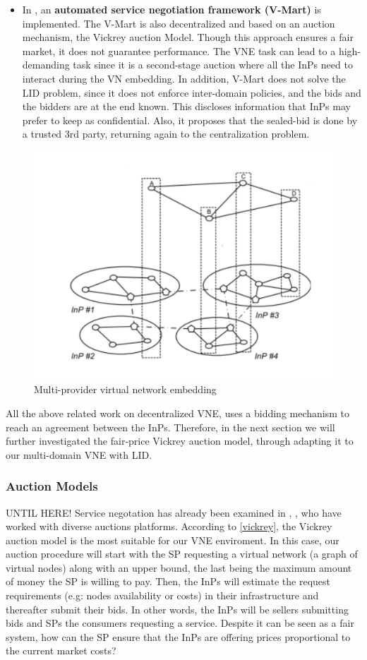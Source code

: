 \begin{itemize}
\item In \citep{zaheer2010multi}, an \textbf{automated service negotiation framework (V-Mart)} is implemented. The V-Mart is also decentralized and based on an auction mechanism, the Vickrey auction Model.
Though this approach ensures a fair market, it does not guarantee performance. The VNE task can lead to a high-demanding task since it is a second-stage auction where all the InPs need to interact during the VN embedding. In addition, V-Mart does not solve the LID problem, since it does not enforce inter-domain policies, and the bids and the bidders are at the end known. This discloses information that InPs may prefer to keep as confidential. Also, it proposes that the sealed-bid is done by a trusted 3rd party, returning again to the centralization problem.

\end{itemize}

\begin{figure}[bth]
	\centering
	\includegraphics[width=0.6\linewidth]{gfx/multi.png}    
  	\caption{Multi-provider virtual network embedding \citep{chowdhury2010polyvine}}
  	\label{fig:multi}
\end{figure}
	
All the above related work on decentralized VNE, uses a bidding mechanism to reach an agreement between the InPs. Therefore, in the next section we will further investigated the fair-price Vickrey auction model, through adapting it to our multi-domain VNE with LID.

\subsubsection{Auction Models}

UNTIL HERE!
Service negotation has already been examined in \citep{hausheer2005peermart}, \cite{ogston2002peer}, who have worked with diverse auctions platforms.
According to \ref{vickrey}, the Vickrey auction model is the most suitable for our VNE enviroment. In this case, our auction procedure will start with the SP requesting a virtual network (a graph of virtual nodes) along with an upper bound, the last being the maximum amount of money the SP is willing to pay. Then, the InPs will estimate the request requirements (e.g: nodes availability or costs) in their infrastructure and thereafter submit their bids. In other words, the InPs will be sellers submitting bids and SPs the consumers requesting a service. Despite it can be seen as a fair system, how can the SP ensure that the InPs are offering prices proportional to the current market costs?

